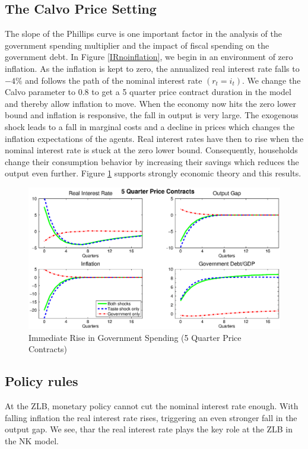 \documentclass[12pt,a4paper,oneside,titlepage]{article}
\begin{document}
\subsection*{The Calvo Price Setting}
The slope of the Phillips curve is one important factor in the analysis of the government spending multiplier and the impact of fiscal spending on the government debt. In Figure \ref{IRnoinflation}, we begin in an environment of zero inflation.
As the inflation is kept to zero, the annualized real interest rate falls to $-4\%$ and follows the path of the nominal interest rate $\left(r_t = i_t\right)$. We change the Calvo parameter to 0.8 to get a 5 quarter price contract duration in the model and thereby allow inflation to move. When the economy now hits the zero lower bound and inflation is responsive, the fall in output is very large. The exogenous shock leads to a fall in marginal costs and a decline in prices which changes the inflation expectations of the agents. Real interest rates have then to rise when the nominal interest rate is stuck at the zero lower bound. Consequently, households change their consumption behavior by increasing their savings which reduces the output even further. Figure \ref{IR5quarter} supports strongly economic theory and this results.

\begin{figure}[p]
\includegraphics[width=\textwidth]{Paperpics/Figure25quarter}
\caption{Immediate Rise in Government Spending (5 Quarter Price Contracts)}
\label{IR5quarter}
\end{figure}


\subsection*{Policy rules}

At the ZLB, monetary policy cannot cut the nominal interest rate enough. With falling inflation the real interest rate rises, triggering an even stronger fall in the output gap. We see, thar the real interest rate plays the key role at the ZLB in the NK model.
\end{document}
